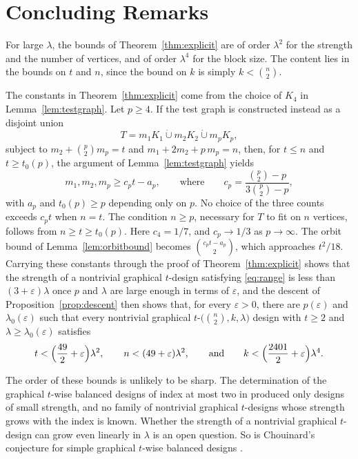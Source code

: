 \documentclass[12pt]{amsart}
\theoremstyle{definition}
\newcommand{\dcup}{\mathbin{\dot\cup}}
\begin{document}
\section{Concluding Remarks}
\label{sec:consequences}

For large $\lambda$, the bounds of Theorem~\ref{thm:explicit} are of order
$\lambda^2$ for the strength and the number of vertices, and of order
$\lambda^4$ for the block size. The content lies in the bounds on $t$ and
$n$, since the bound on $k$ is simply $k < \binom{n}{2}$.

The constants in Theorem~\ref{thm:explicit} come from the choice of $K_4$ in
Lemma~\ref{lem:testgraph}. Let $p \geq 4$. If the test graph is constructed
instead as a disjoint union
\[
T = m_1 K_1 \dcup m_2 K_2 \dcup m_p K_p,
\]
subject to $m_2 + \binom{p}{2} m_p = t$ and $m_1 + 2 m_2 + p\, m_p = n$,
then, for $t \leq n$ and $t \geq t_0(p)$, the argument of
Lemma~\ref{lem:testgraph} yields
\[
m_1, m_2, m_p \geq c_p t - a_p,
\qquad \text{where} \qquad
c_p = \frac{\binom{p}{2} - p}{3 \binom{p}{2} - p},
\]
with $a_p$ and $t_0(p) \geq p$ depending only on $p$. No choice of the three
counts exceeds $c_p t$ when $n = t$. The condition $n \geq p$, necessary for
$T$ to fit on $n$ vertices, follows from $n \geq t \geq t_0(p)$. Here $c_4 =
1/7$, and $c_p \to 1/3$ as $p \to \infty$. The orbit bound of
Lemma~\ref{lem:orbitbound} becomes $\binom{c_p t - a_p}{2}$, which
approaches $t^2/18$. Carrying these constants through the proof of
Theorem~\ref{thm:explicit} shows that the strength of a nontrivial graphical
$t$-design satisfying \eqref{eq:range} is less than $(3 +
\varepsilon)\lambda$ once $p$ and $\lambda$ are large enough in terms of
$\varepsilon$, and the descent of Proposition~\ref{prop:descent} then shows
that, for every $\varepsilon > 0$, there are $p(\varepsilon)$ and
$\lambda_0(\varepsilon)$ such that every nontrivial graphical
$t$-$\bigl(\binom{n}{2}, k, \lambda\bigr)$ design with $t \geq 2$ and
$\lambda \geq \lambda_0(\varepsilon)$ satisfies
\[
t < \Bigl(\frac{49}{2} + \varepsilon\Bigr)\lambda^2,
\qquad
n < (49 + \varepsilon)\lambda^2,
\qquad \text{and} \qquad
k < \Bigl(\frac{2401}{2} + \varepsilon\Bigr)\lambda^4.
\]

The order of these bounds is unlikely to be sharp. The determination of the
graphical $t$-wise balanced designs of index at most two in \cite{CKK1983}
produced only designs of small strength, and no family of nontrivial
graphical $t$-designs whose strength grows with the index is known. Whether
the strength of a nontrivial graphical $t$-design can grow even linearly in
$\lambda$ is an open question. So is Chouinard's conjecture for simple
graphical $t$-wise balanced designs \cite{Chouinard1996}.
\end{document}
